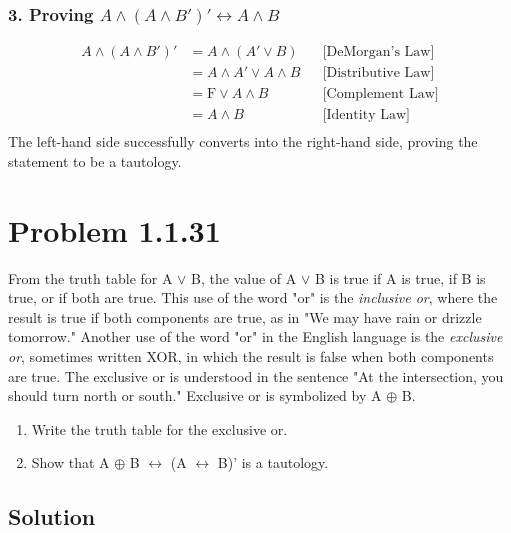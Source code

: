\documentclass[12pt]{article}
\begin{document}
\subsubsection*{3. Proving $A \land (A \land B')' \leftrightarrow A \land B$}

\begin{align*}
A \land (A \land B')' &= A \land (A' \lor B) && \text{[DeMorgan's Law]} \\
&= A \land A' \lor A \land B && \text{[Distributive Law]} \\
&= \text{F} \lor A \land B && \text{[Complement Law]} \\
&= A \land B && \text{[Identity Law]} \\
\end{align*}
The left-hand side successfully converts into the right-hand side, proving the statement to be a tautology.


\newpage
\section*{Problem 1.1.31}
From the truth table for A $\lor$ B, the value of A $\lor$ B is true if A is true, if B is true, or if both are true. This use of the word "or" is the \textit{inclusive or}, where the result is true if both components are true, as in "We may have rain or drizzle tomorrow." Another use of the word "or" in the English language is the \textit{exclusive or}, sometimes written XOR, in which the result is false when both components are true. The exclusive or is understood in the sentence "At the intersection, you should turn north or south." Exclusive or is symbolized by A $\oplus$ B.
\begin{enumerate}
\item Write the truth table for the exclusive or.
\item Show that A $\oplus$ B $\leftrightarrow$ (A $\leftrightarrow$ B)' is a tautology.
\end{enumerate}


\newpage
\subsection*{Solution}
\end{document}
